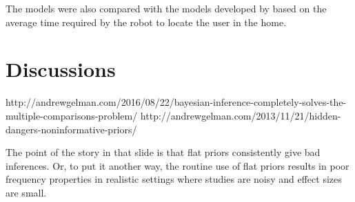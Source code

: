 
The models were also compared with the models developed by \cite{krajnik_wheres_2015}  based on the average time required by the robot to locate the user in the home.





\section{Discussions}

http://andrewgelman.com/2016/08/22/bayesian-inference-completely-solves-the-multiple-comparisons-problem/
http://andrewgelman.com/2013/11/21/hidden-dangers-noninformative-priors/

The point of the story in that slide is that flat priors consistently give bad inferences. Or, to put it another way, the routine use of flat priors results in poor frequency properties in realistic settings where studies are noisy and effect sizes are small.
\label{sec:}






